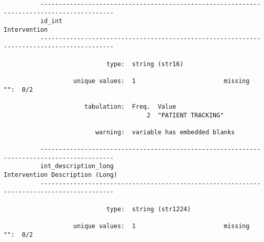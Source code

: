 \documentclass{article}
\begin{document}
\begin{verbatim}
          ------------------------------------------------------------------------------------------
          id_int                                                                        Intervention
          ------------------------------------------------------------------------------------------
          
                            type:  string (str16)
          
                   unique values:  1                        missing "":  0/2
          
                      tabulation:  Freq.  Value
                                       2  "PATIENT TRACKING"
          
                         warning:  variable has embedded blanks
          
          ------------------------------------------------------------------------------------------
          int_description_long                                       Intervention Description (Long)
          ------------------------------------------------------------------------------------------
          
                            type:  string (str1224)
          
                   unique values:  1                        missing "":  0/2
          

\end{verbatim}
\end{document}
